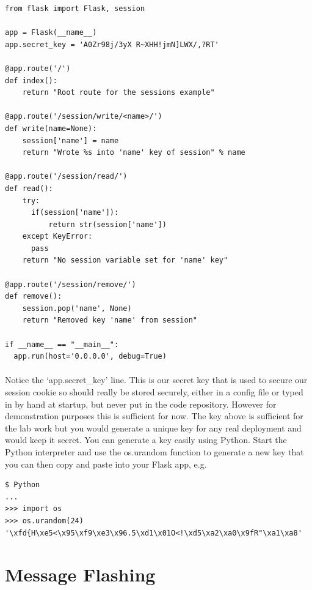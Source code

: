\documentclass[12pt, a4paper, twoside]{book}
\begin{document}
\begin{lstlisting}
from flask import Flask, session

app = Flask(__name__)
app.secret_key = 'A0Zr98j/3yX R~XHH!jmN]LWX/,?RT'

@app.route('/')
def index():
    return "Root route for the sessions example"

@app.route('/session/write/<name>/')
def write(name=None):
    session['name'] = name
    return "Wrote %s into 'name' key of session" % name

@app.route('/session/read/')
def read():
    try:
      if(session['name']):
          return str(session['name'])
    except KeyError:
      pass
    return "No session variable set for 'name' key"

@app.route('/session/remove/')
def remove():
    session.pop('name', None)
    return "Removed key 'name' from session"

if __name__ == "__main__":
  app.run(host='0.0.0.0', debug=True)
\end{lstlisting}

\paragraph{} Notice the `app.secret\_key' line. This is our secret key that is used to secure our session cookie so should really be stored securely, either in a config file or typed in by hand at startup, but never put in the code repository. However for demonstration purposes this is sufficient for now. The key above is sufficient for the lab work but you would generate a unique key for any real deployment and would keep it secret. You can generate a key easily using Python. Start the Python interpreter and use the os.urandom function to generate a new key that you can then copy and paste into your Flask app, e.g.

\begin{lstlisting}
$ Python
...
>>> import os
>>> os.urandom(24)
'\xfd{H\xe5<\x95\xf9\xe3\x96.5\xd1\x01O<!\xd5\xa2\xa0\x9fR"\xa1\xa8'
\end{lstlisting}


\section{Message Flashing}
\label{message-flashing}
\end{document}
